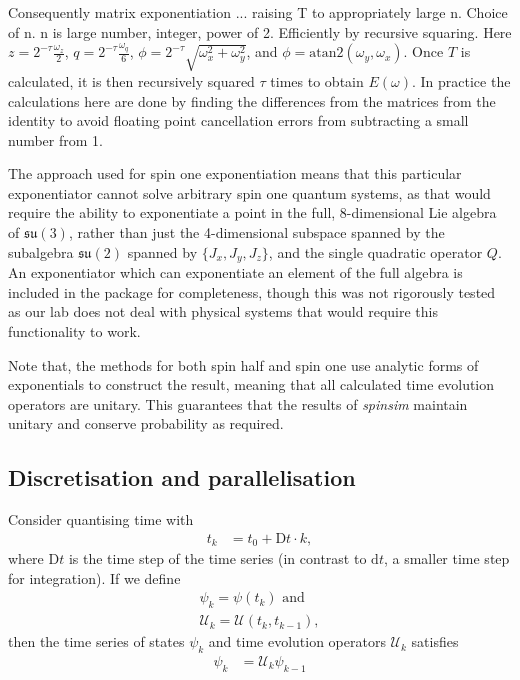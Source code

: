 \documentclass{jors}
\begin{document}
		Consequently matrix exponentiation ... raising T to appropriately large n.
		Choice of n. n is large number, integer, power of 2. Efficiently by recursive squaring.
		Here \(z = 2^{-\tau}\frac{\omega_z}{2}\), \(q = 2^{-\tau}\frac{\omega_q}{6}\), \(\phi = 2^{-\tau}\sqrt{\omega_x^2 + \omega_y^2}\), and \(\phi = \mathrm{atan}2(\omega_y, \omega_x)\).
		Once \(T\) is calculated, it is then recursively squared \(\tau\) times to obtain \(E(\omega)\).
		In practice the calculations here are done by finding the differences from the matrices from the identity to avoid floating point cancellation errors from subtracting a small number from 1.

		The approach used for spin one exponentiation means that this particular exponentiator cannot solve arbitrary spin one quantum systems, as that would require the ability to exponentiate a point in the full, 8-dimensional Lie algebra of \(\mathfrak{su}(3)\), rather than just the 4-dimensional subspace spanned by the subalgebra \(\mathfrak{su}(2)\) spanned by \(\{J_x, J_y, J_z\}\), and the single quadratic operator \(Q\).
		An exponentiator which can exponentiate an element of the full algebra is included in the package for completeness, though this was not rigorously tested as our lab does not deal with physical systems that would require this functionality to work.

		Note that, the methods for both spin half and spin one use analytic forms of exponentials to construct the result, meaning that all calculated time evolution operators are unitary.
		This guarantees that the results of \emph{spinsim} maintain unitary and conserve probability as required.

	\subsection{Discretisation and parallelisation}
		Consider quantising time with
		\begin{align}
			t_k &= t_0 + \mathrm{D}t\cdot k,
		\end{align}
		where \(\mathrm{D}t\) is the time step of the time series (in contrast to \(\mathrm{d}t\), a smaller time step for integration).
		If we define
		\begin{align}
			\psi_k = \psi(t_k)\textrm{ and}\\
			\mathcal{U}_k = \mathcal{U}(t_{k}, t_{k-1}),
		\end{align}
		then the time series of states \(\psi_k\) and time evolution operators \(\mathcal{U}_k\) satisfies
		\begin{align}
			\psi_k &= \mathcal{U}_k\psi_{k-1}\label{eq:integration_compilation}
		\end{align}
\end{document}
